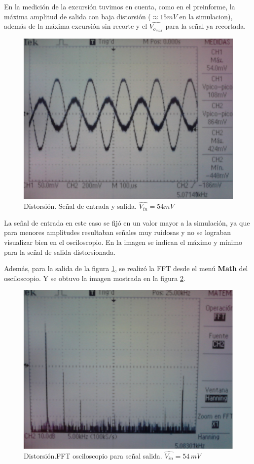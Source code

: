 \documentclass[10pt,spanish,a4paper,notitlepage]{article}
\begin{document}
En la medición de la excursión tuvimos en cuenta, como en el preinforme, la máxima amplitud de salida con baja distorsión ($\approx 15mV$ en la simulacion), además de la máxima excursión sin recorte y el $\widehat{V_{o_{max}}}$ para la señal ya recortada.

\begin{figure}[H]
\centering
\includegraphics[scale=0.15]{mediciones/distorsion_54mV.jpg}
\caption{Distorsión. Señal de entrada y salida. $\widehat{V_{in}}=54mV$}
\label{fig:distorsion_54mV}
\end{figure}
La señal de entrada en este caso se fijó en un valor mayor a la simulación, ya que para menores amplitudes resultaban señales muy ruidosas y no se lograban visualizar bien en el osciloscopio. En la imagen se indican el máximo y mínimo para la señal de salida distorsionada.

Además, para la salida de la figura \ref{fig:distorsion_54mV}, se realizó la FFT desde el menú \textbf{Math} del osciloscopio. Y se obtuvo la imagen mostrada en la
figura \ref{fig:FFT_54mV}.

\begin{figure}[H]
\centering
\includegraphics[scale=0.15]{mediciones/FFT_54mV.jpg}
\caption{Distorsión.FFT  osciloscopio para señal salida. $\widehat{V_{in}}=54\,\unit{mV}$}
\label{fig:FFT_54mV}
\end{figure}
\end{document}
